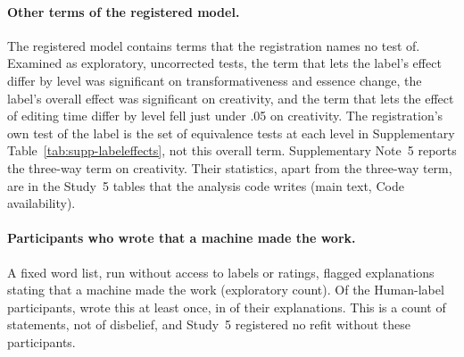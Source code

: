 

\paragraph*{Other terms of the registered model.}
The registered model contains terms that the registration names no test of. Examined as exploratory, uncorrected tests, the term that lets the label's effect differ by level was significant on transformativeness and essence change, the label's overall effect was significant on creativity, and the term that lets the effect of editing time differ by level fell just under .05 on creativity. The registration's own test of the label is the set of equivalence tests at each level in Supplementary Table~\ref{tab:supp-labeleffects}, not this overall term. Supplementary Note~5 reports the three-way term on creativity. Their statistics, apart from the three-way term, are in the Study~5 tables that the analysis code writes (main text, Code availability).

\paragraph*{Participants who wrote that a machine made the work.}
A fixed word list, run without access to labels or ratings, flagged explanations stating that a machine made the work (exploratory count). Of the \SFiveMachineMadeNHuman{} Human-label participants, \SFiveMachineMadeN{} wrote this at least once, in \SFiveMachineMadeResponses{} of their \SFiveMachineMadeNResponses{} explanations. This is a count of statements, not of disbelief, and Study~5 registered no refit without these participants.

